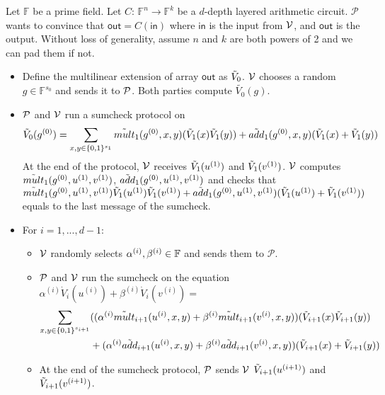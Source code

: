 \begin{protocol}
	\label{protocol::CMT}
	Let $\mathbb{F}$ be a prime field. Let $C$: $\mathbb{F}^n\rightarrow \mathbb{F}^k$ be a $d$-depth layered arithmetic circuit. $\mathcal{P}$ wants to convince that $\mathsf{out}=C(\mathsf{in})$ where $\mathsf{in}$ is the input from $\V$, and $\mathsf{out}$ is the output. Without loss of generality, assume $n$ and $k$ are both powers of 2 and we can pad them if not.

	\begin{itemize}
		\item Define the multilinear extension of array $\mathsf{out}$ as $\tV_0$. $\V$ chooses a random $g \in \mathbb{F}^{s_0}$ and sends it to $\P$. Both parties compute $\tilde{V_0}(g)$.
		\item $\P$ and $\V$ run a sumcheck protocol on
		\[
		\tV_{0}(g^{(0)})=\sum_{x, y\in \binary^{s_{1}}}\tilde{mult}_{1}(g^{(0)}, x, y)(\tV_{1}(x)\tV_{1}(y))+\tilde{add}_{1}(g^{(0)},x,y)(\tV_{1}(x)+\tV_{1}(y))
		\]
		At the end of the protocol, $\V$ receives $\tV_1(u^{(1)})$ and $\tV_1(v^{(1)})$. $\V$ computes $\tmult_1(g^{(0)},u^{(1)},v^{(1)})$, $\tadd_1(g^{(0)},u^{(1)},v^{(1)})$ and checks that $\tmult_1(g^{(0)},u^{(1)},v^{(1)})\tV_1(u^{(1)})\tV_1(v^{(1)})+\tadd_1(g^{(0)},u^{(1)},v^{(1)})(\tV_1(u^{(1)})+\tV_1(v^{(1)}))$ equals to the last message of the sumcheck.
		
		\item For $i=1,...,d-1$:
		\begin{itemize}
			
			\item $\V$ randomly selects $\alpha^{(i)}, \beta^{(i)}\in\F$ and sends them to $\mathcal{P}$.
			\item $\P$ and $\V$ run the sumcheck on the equation\\

			$\alpha^{(i)}\dot{V}_i(u^{(i)})+\beta^{(i)}\dot{V}_i(v^{(i)})=$
			\begin{align*}
			\sum_{x, y\in \binary^{s_{i+1}}}&((\alpha^{(i)}\tilde{mult}_{i+1}(u^{(i)}, x, y)+\beta^{(i)}\tilde{mult}_{i+1}(v^{(i)}, x, y))(\tV_{i+1}(x)\tV_{i+1}(y))\\
			&+(\alpha^{(i)}\tilde{add}_{i+1}(u^{(i)}, x, y)+\beta^{(i)}\tilde{add}_{i+1}(v^{(i)}, x, y))(\tV_{i+1}(x)+\tV_{i+1}(y))\nonumber
			\end{align*}
					
			\item At the end of the sumcheck protocol, $\P$ sends $\V$ $\tV_{i+1}(u^{(i+1)})$ and $\tV_{i+1}(v^{(i+1)})$.
			

\end{itemize}
\end{itemize}
\end{protocol}
